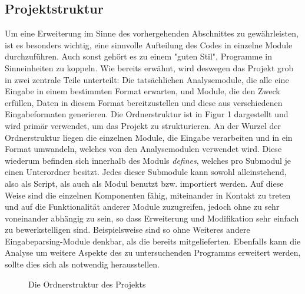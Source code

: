 \documentclass[11pt]{article}
\begin{document}
\subsection{Projektstruktur} Um eine Erweiterung im Sinne des vorhergehenden Abschnittes zu
gewährleisten, ist es besonders wichtig, eine sinnvolle Aufteilung des Codes in einzelne Module
durchzuführen. Auch sonst gehört es zu einem  "guten Stil", Programme in Sinneinheiten zu koppeln.
Wie bereits erwähnt, wird deswegen das Projekt grob in zwei zentrale Teile unterteilt: Die
tatsächlichen Analysemodule, die alle eine Eingabe in einem bestimmten Format erwarten, und Module,
die den Zweck erfüllen, Daten in diesem Format bereitzustellen und diese aus verschiedenen
Eingabeformaten generieren. Die Ordnerstruktur ist in Figur 1 dargestellt und wird
primär verwendet, um das Projekt zu strukturieren. An der Wurzel der Ordnerstruktur liegen die
einzelnen Module, die Eingabe verarbeiten und in ein Format umwandeln, welches von den Analysemodulen
verwendet wird. Diese wiederum befinden sich innerhalb des Moduls \textit{defines}, welches pro
Submodul je einen Unterordner besitzt. Jedes dieser Submodule kann sowohl alleinstehend, also als
Script, als auch als Modul benutzt bzw. importiert werden. Auf diese Weise sind die
einzelnen Komponenten fähig, miteinander in Kontakt zu treten und auf die Funktionalität anderer
Module zuzugreifen, jedoch ohne zu sehr voneinander abhängig zu sein, so dass Erweiterung und
Modifikation sehr einfach zu bewerkstelligen sind. Beispielsweise sind so ohne Weiteres andere
Eingabeparsing-Module denkbar, als die bereits mitgelieferten. Ebenfalls kann die Analyse um weitere
Aspekte des zu untersuchenden Programms erweitert werden, sollte dies sich als notwendig
herausstellen.
\begin{figure}[h!]
	\caption{Die Ordnerstruktur des Projekts}
\end{figure}
\end{document}
